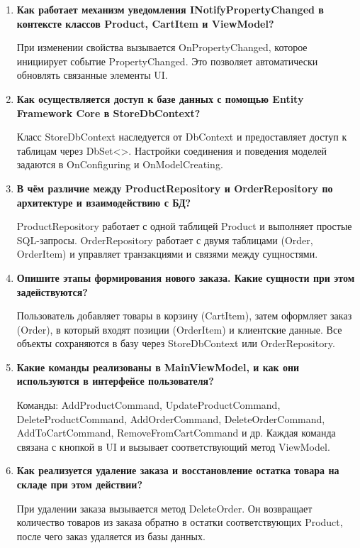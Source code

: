 \documentclass[12pt]{article}
\renewcommand{\texttt}[1]{{\small\ttfamily #1}}
\numberwithin{listing}{section}
\numberwithin{figure}{section}
\begin{document}
\begin{enumerate}
	\item \textbf{Как работает механизм уведомления \texttt{INotifyPropertyChanged} в контексте классов \texttt{Product}, \texttt{CartItem} и ViewModel?}

	      При изменении свойства вызывается \texttt{OnPropertyChanged}, которое инициирует событие \texttt{Proper\-tyChanged}. Это позволяет автоматически обновлять связанные элементы UI.

	\item \textbf{Как осуществляется доступ к базе данных с помощью Entity Framework Core в \texttt{StoreDb\-Context}?}

	      Класс \texttt{StoreDbContext} наследуется от \texttt{DbContext} и предоставляет доступ к таблицам через \texttt{DbSet<>}. Настройки соединения и поведения моделей задаются в \texttt{OnConfiguring} и \texttt{OnModel\-Creating}.

	\item \textbf{В чём различие между \texttt{ProductRepository} и \texttt{OrderRepository} по архитектуре и взаимодействию с БД?}

	      \texttt{ProductRepository} работает с одной таблицей \texttt{Product} и выполняет простые SQL-запросы. \texttt{OrderRepository} работает с двумя таблицами (\texttt{Order}, \texttt{OrderItem}) и управляет транзакциями и связями между сущностями.

	\item \textbf{Опишите этапы формирования нового заказа. Какие сущности при этом задействуются?}

	      Пользователь добавляет товары в корзину (\texttt{CartItem}), затем оформляет заказ (\texttt{Order}), в который входят позиции (\texttt{OrderItem}) и клиентские данные. Все объекты сохраняются в базу через \texttt{StoreDbContext} или \texttt{OrderRepository}.

	\item \textbf{Какие команды реализованы в \texttt{MainViewModel}, и как они используются в интерфейсе пользователя?}

	      Команды: \texttt{AddProductCommand}, \texttt{UpdateProductCommand}, \texttt{DeleteProductCommand}, \texttt{AddOrderCommand}, \texttt{DeleteOrderCommand}, \texttt{AddToCartCommand}, \texttt{RemoveFromCartCommand} и др. Каждая команда связана с кнопкой в UI и вызывает соответствующий метод ViewModel.

	\item \textbf{Как реализуется удаление заказа и восстановление остатка товара на складе при этом действии?}

	      При удалении заказа вызывается метод \texttt{DeleteOrder}. Он возвращает количество товаров из заказа обратно в остатки соответствующих \texttt{Product}, после чего заказ удаляется из базы данных.
\end{enumerate}
\end{document}

